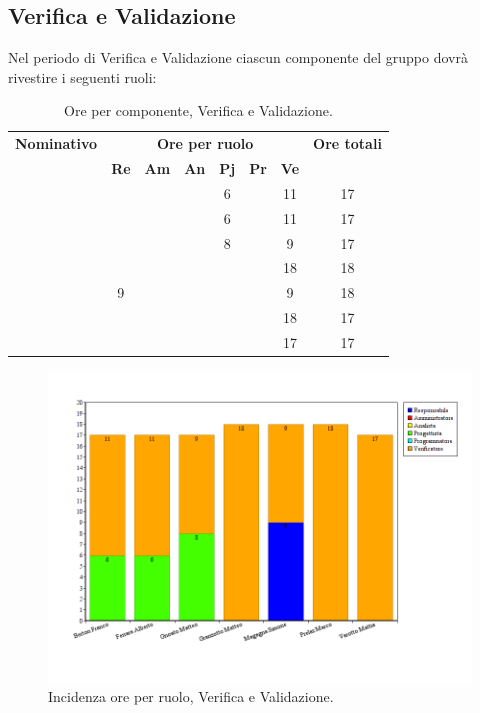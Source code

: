 \subsection{Verifica e Validazione}
Nel periodo di Verifica e Validazione ciascun componente del gruppo dovrà rivestire i seguenti ruoli:
\begin{table}[H]
	\begin{center}
		\begin{tabular}{|c|c|c|c|c|c|c|c|}
			\hline
			\textbf{Nominativo} & \multicolumn{6}{c|}{\textbf{Ore per ruolo}} & \textbf{Ore totali} \\
			& \textbf{Re} & \textbf{Am} & \textbf{An} & \textbf{Pj} & \textbf{Pr} & \textbf{Ve} & \\
			\hline
			\FB		&		&		&		&	6	&		&	11	&	17	\\
			\hline
			\AF		&		&		&		&	 6	&		&	11	& 	17	\\
			\hline	
			\GN		&		&		&		&	8	&		&	9	&	17	\\
			\hline								
			\GR	&		&	 	&		&		&	 	& 	18	&	18	\\
			\hline
			\SM 		&	9	&		&		&		&		& 	9	&	18	\\
			\hline	
			\MP 		& 		&		&		&		&		&	18	&	17	\\
			\hline					
			\MV 		&		&		&		&		&		&	17	& 	17	\\
			\hline
		\end{tabular}
	\end{center}
	\caption{Ore per componente, Verifica e Validazione.}
\end{table}

\begin{figure}[H]
	\centering
	\includegraphics[scale=0.4]{immagini/Grafi/GrafoVV}
	\caption{Incidenza ore per ruolo, Verifica e Validazione.}
\end{figure}

